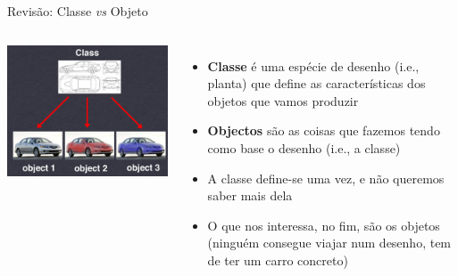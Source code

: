 \documentclass[portuguese, aspectratio=169, xcolor=table]{beamer}
\begin{document}
\begin{frame}{Revisão: Classe \textit{vs} Objeto}
\begin{columns}
\begin{center}
    \includegraphics[width=\linewidth]{figures/car}
\end{center}
\begin{itemize}
    \item \textbf{Classe} é uma espécie de desenho (i.e., planta) que define as características dos objetos que vamos produzir
    \item \textbf{Objectos} são as coisas que fazemos tendo como base o desenho (i.e., a classe)
    \item A classe define-se uma vez, e não queremos saber mais dela
    \item O que nos interessa, no fim, são os objetos (ninguém consegue viajar num desenho, tem de ter um carro concreto)
\end{itemize}
\end{columns}
\end{frame}
\end{document}
